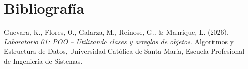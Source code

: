 \documentclass[12pt]{article}
\begin{document}
\section{Bibliografía}
     Guevara, K., Flores, O., Galarza, M., Reinoso, G., 
    \& Manrique, L. (2026). \textit{Laboratorio 01: POO -- 
    Utilizando clases y arreglos de objetos}. Algoritmos y 
    Estructura de Datos, Universidad Católica de Santa María, 
    Escuela Profesional de Ingeniería de Sistemas.
\end{document}
